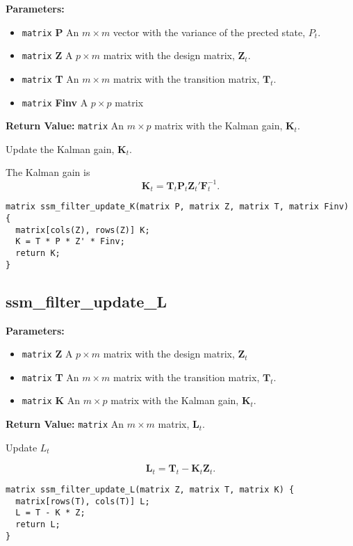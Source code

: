 \documentclass[]{book}
\providecommand{\tightlist}{%
  \setlength{\itemsep}{0pt}\setlength{\parskip}{0pt}}
\newcommand{\mat}[1]{\boldsymbol{#1}}
\begin{document}
\textbf{Parameters:}

\begin{itemize}
\tightlist
\item
  \texttt{matrix} \textbf{P} An \(m \times m\) vector with the variance
  of the prected state, \(P_t\).
\item
  \texttt{matrix} \textbf{Z} A \(p \times m\) matrix with the design
  matrix, \(\mat{Z}_t\).
\item
  \texttt{matrix} \textbf{T} An \(m \times m\) matrix with the
  transition matrix, \(\mat{T}_t\).
\item
  \texttt{matrix} \textbf{Finv} A \(p \times p\) matrix
\end{itemize}

\textbf{Return Value:} \texttt{matrix} An \(m \times p\) matrix with the
Kalman gain, \(\mat{K}_t\).

Update the Kalman gain, \(\mat{K}_t\).

The Kalman gain is \[
\mat{K}_t = \mat{T}_t \mat{P}_t \mat{Z}_t' \mat{F}^{-1}_t .
\]

\begin{verbatim}
matrix ssm_filter_update_K(matrix P, matrix Z, matrix T, matrix Finv) {
  matrix[cols(Z), rows(Z)] K;
  K = T * P * Z' * Finv;
  return K;
}
\end{verbatim}

\subsection{ssm\_filter\_update\_L}\label{ssmux5ffilterux5fupdateux5fl}

\textbf{Parameters:}

\begin{itemize}
\tightlist
\item
  \texttt{matrix} \textbf{Z} A \(p \times m\) matrix with the design
  matrix, \(\mat{Z}_t\)
\item
  \texttt{matrix} \textbf{T} An \(m \times m\) matrix with the
  transition matrix, \(\mat{T}_t\).
\item
  \texttt{matrix} \textbf{K} An \(m \times p\) matrix with the Kalman
  gain, \(\mat{K}_t\).
\end{itemize}

\textbf{Return Value:} \texttt{matrix} An \(m \times m\) matrix,
\(\mat{L}_t\).

Update \(L_t\)

\[
\mat{L}_t = \mat{T}_t - \mat{K}_t \mat{Z}_t .
\]

\begin{verbatim}
matrix ssm_filter_update_L(matrix Z, matrix T, matrix K) {
  matrix[rows(T), cols(T)] L;
  L = T - K * Z;
  return L;
}
\end{verbatim}
\end{document}
